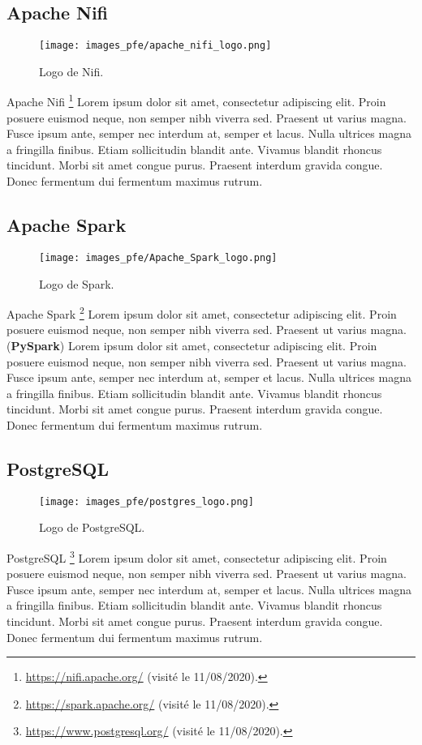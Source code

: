 \subsection*{Apache Nifi}
\begin{wrapfigure}{r}{0.3\textwidth}
  \centering
  \texttt{[image: images\_pfe/apache\_nifi\_logo.png]}
  \caption{Logo de Nifi.}
\end{wrapfigure}
\FloatBarrier
Apache Nifi \footnote{\url{https://nifi.apache.org/} (visité le 11/08/2020).} Lorem ipsum dolor sit amet, consectetur adipiscing elit. Proin posuere euismod neque, non semper nibh viverra sed. Praesent ut varius magna. Fusce ipsum ante, semper nec interdum at, semper et lacus. Nulla ultrices magna a fringilla finibus. Etiam sollicitudin blandit ante. Vivamus blandit rhoncus tincidunt. Morbi sit amet congue purus. Praesent interdum gravida congue. Donec fermentum dui fermentum maximus rutrum.


\subsection*{Apache Spark}
\begin{wrapfigure}{r}{0.3\textwidth}
  \centering
  \texttt{[image: images\_pfe/Apache\_Spark\_logo.png]}
  \caption{Logo de Spark.}
\end{wrapfigure}
\FloatBarrier
Apache Spark \footnote{\url{https://spark.apache.org/} (visité le 11/08/2020).} Lorem ipsum dolor sit amet, consectetur adipiscing elit. Proin posuere euismod neque, non semper nibh viverra sed. Praesent ut varius magna. (\textbf{PySpark}) Lorem ipsum dolor sit amet, consectetur adipiscing elit. Proin posuere euismod neque, non semper nibh viverra sed. Praesent ut varius magna. Fusce ipsum ante, semper nec interdum at, semper et lacus. Nulla ultrices magna a fringilla finibus. Etiam sollicitudin blandit ante. Vivamus blandit rhoncus tincidunt. Morbi sit amet congue purus. Praesent interdum gravida congue. Donec fermentum dui fermentum maximus rutrum.


\subsection*{PostgreSQL}
\begin{wrapfigure}[9]{r}{0.3\textwidth}
  \centering
  \texttt{[image: images\_pfe/postgres\_logo.png]}
  \caption{Logo de PostgreSQL.}
\end{wrapfigure}
\FloatBarrier
PostgreSQL \footnote{\url{https://www.postgresql.org/} (visité le 11/08/2020).} Lorem ipsum dolor sit amet, consectetur adipiscing elit. Proin posuere euismod neque, non semper nibh viverra sed. Praesent ut varius magna. Fusce ipsum ante, semper nec interdum at, semper et lacus. Nulla ultrices magna a fringilla finibus. Etiam sollicitudin blandit ante. Vivamus blandit rhoncus tincidunt. Morbi sit amet congue purus. Praesent interdum gravida congue. Donec fermentum dui fermentum maximus rutrum.


